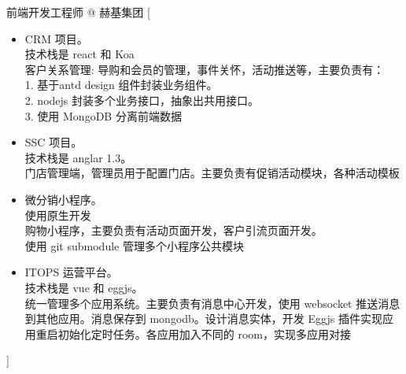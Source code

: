 \documentclass[zh]{resume}
\begin{document}
\begin{experiences}
    {前端开发工程师 @ 赫基集团}%
    [\begin{itemize}
      \item CRM 项目。\\ 技术栈是 react 和 Koa \\ 客户关系管理: 导购和会员的管理，事件关怀，活动推送等，主要负责有：\\ 1. 基于antd design 组件封装业务组件。\\ 2. nodejs 封装多个业务接口，抽象出共用接口。 \\ 3. 使用 MongoDB 分离前端数据
      \item SSC 项目。\\ 技术栈是 anglar 1.3。\\ 门店管理端，管理员用于配置门店。主要负责有促销活动模块，各种活动模板
      \item 微分销小程序。\\ 使用原生开发 \\ 购物小程序，主要负责有活动页面开发，客户引流页面开发。\\ 使用 git submodule 管理多个小程序公共模块
      \item ITOPS 运营平台。\\ 技术栈是 vue 和 eggjs。\\ 统一管理多个应用系统。主要负责有消息中心开发，使用 websocket 推送消息到其他应用。消息保存到 mongodb。设计消息实体，开发 Eggjs 插件实现应用重启初始化定时任务。各应用加入不同的 room，实现多应用对接
    \end{itemize}]

\end{experiences}
\end{document}
